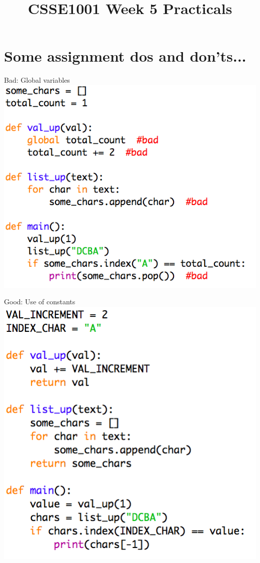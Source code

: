 \documentclass[week2]{csse1001}
\title{CSSE1001 Week 5 Practicals}
\begin{document}
\begin{frame} 
\maketitle
\end{frame}

\section{Some assignment dos and don'ts...}

\begin{topic}{Bad: Global variables}
\includegraphics[scale=1]{bad_python/globals}
\end{topic}

\begin{topic}{Good: Use of constants}
\includegraphics[scale=1]{bad_python/constants}
\end{topic}
\end{document}
